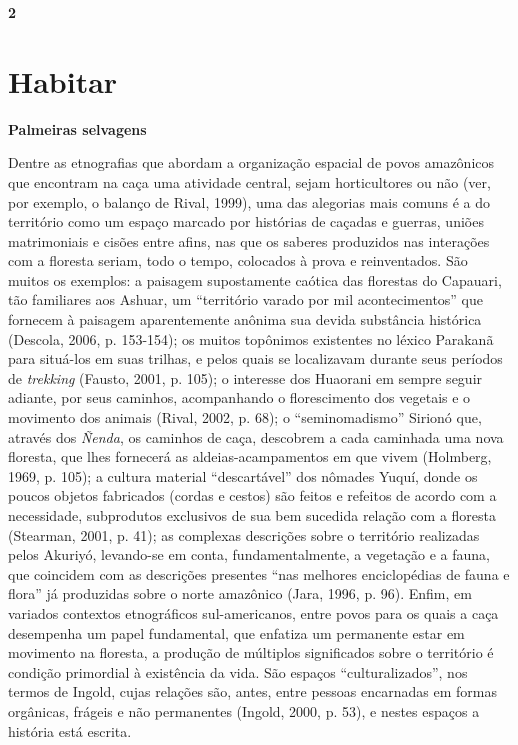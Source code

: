 \textbf{2}

\hypertarget{habitar}{%
\section{Habitar}\label{habitar}}

\textbf{Palmeiras selvagens}

Dentre as etnografias que abordam a organização espacial de povos
amazônicos que encontram na caça uma atividade central, sejam
horticultores ou não (ver, por exemplo, o balanço de Rival, 1999), uma
das alegorias mais comuns é a do território como um espaço marcado por
histórias de caçadas e guerras, uniões matrimoniais e cisões entre
afins, nas que os saberes produzidos nas interações com a floresta
seriam, todo o tempo, colocados à prova e reinventados. São muitos os
exemplos: a paisagem supostamente caótica das florestas do Capauari, tão
familiares aos Ashuar, um ``território varado por mil acontecimentos''
que fornecem à paisagem aparentemente anônima sua devida substância
histórica (Descola, 2006, p. 153-154); os muitos topônimos existentes no
léxico Parakanã para situá-los em suas trilhas, e pelos quais se
localizavam durante seus períodos de \emph{trekking} (Fausto, 2001, p.
105); o interesse dos Huaorani em sempre seguir adiante, por seus
caminhos, acompanhando o florescimento dos vegetais e o movimento dos
animais (Rival, 2002, p. 68); o ``seminomadismo'' Sirionó que, através
dos \emph{Ñenda}, os caminhos de caça, descobrem a cada caminhada uma
nova floresta, que lhes fornecerá as aldeias-acampamentos em que vivem
(Holmberg, 1969, p. 105); a cultura material ``descartável'' dos nômades
Yuquí, donde os poucos objetos fabricados (cordas e cestos) são feitos e
refeitos de acordo com a necessidade, subprodutos exclusivos de sua bem
sucedida relação com a floresta (Stearman, 2001, p. 41); as complexas
descrições sobre o território realizadas pelos Akuriyó, levando-se em
conta, fundamentalmente, a vegetação e a fauna, que coincidem com as
descrições presentes ``nas melhores enciclopédias de fauna e flora'' já
produzidas sobre o norte amazônico (Jara, 1996, p. 96). Enfim, em
variados contextos etnográficos sul-americanos, entre povos para os
quais a caça desempenha um papel fundamental, que enfatiza um permanente
estar em movimento na floresta, a produção de múltiplos significados
sobre o território é condição primordial à existência da vida. São
espaços ``culturalizados'', nos termos de Ingold, cujas relações são,
antes, entre pessoas encarnadas em formas orgânicas, frágeis e não
permanentes (Ingold, 2000, p. 53), e nestes espaços a história está
escrita.

